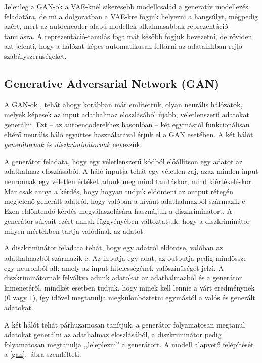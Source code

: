 Jelenleg a GAN-ok a VAE-knél sikeresebb modellcsalád a generatív modellezés feladatára, de mi a dolgozatban a VAE-kre fogjuk helyezni a hangsúlyt, mégpedig azért, mert az autoencoder alapú modellek alkalmasabbak reprezentáció-tanulásra. A reprezentáció-tanulás fogalmát később fogjuk bevezetni, de röviden azt jelenti, hogy a hálózat képes automatikusan feltárni az adatainkban rejlő szabályszerűségeket.

\subsection{Generative Adversarial Network (GAN)}

A GAN-ok \cite{original-GAN}, tehát ahogy korábban már említettük, olyan neurális hálózatok, melyek képesek az input adathalmaz eloszlásából újabb, véletlenszerű adatokat generálni. Ezt -- az autoencoderekhez hasonlóan -- két egymástól funkcionálisan eltérő neurális háló együttes használatával érjük el a GAN esetében. A két hálót \textit{generátornak} és \textit{diszkriminátornak} nevezzük.

A generátor feladata, hogy egy véletlenszerű kódból előállítson egy adatot az adathalmaz eloszlásából. A háló inputja tehát egy véletlen zaj, azaz minden input neuronnak egy véletlen értéket adunk meg mind tanításkor, mind kiértékeléskor. Már csak annyi a kérdés, hogy hogyan tudjuk eldönteni az output rétegén megjelenő generált adatról, hogy valóban a kívánt adathalmazból származik-e. Ezen eldöntendő kérdés megválaszolására használjuk a diszkriminátort. A generátor súlyait ezért annak függvényében változtatjuk, hogy a diszkriminátor milyen mértékben tartja valódinak az adatot.

A diszkriminátor feladata tehát, hogy egy adatról eldöntse, valóban az adathalmazból származik-e. Az inputja egy adat, az outputja pedig mindössze egy neuronból áll: amely az input hitelességének valószínűségét jelzi. A diszkriminátornak felváltva adunk adatokat az adathalmazból és a generátor kimenetéről, mindkét esetben tudjuk, hogy minek kell lennie a várt eredménynek ($0$ vagy $1$), így idővel megtanulja megkülönböztetni egymástól a valós és generált adatokat. 

A két hálót tehát párhuzamosan tanítjuk, a generátor folyamatosan megtanul adatokat generálni az adathalmaz eloszlásából, a diszkriminátor pedig folyamatosan megtanulja ,,leleplezni'' a generátort. A modell alapvető felépítését a \ref{gan}.~ábra szemlélteti.

